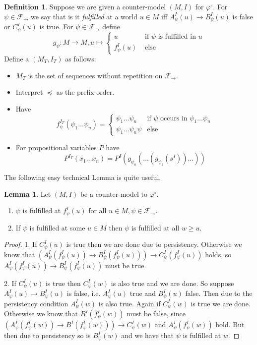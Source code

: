 \documentclass[a4paper,12pt]{report}
\theoremstyle{definition}
\theoremstyle{definition}
\theoremstyle{definition}
\newtheorem{lemma}[theorem]{Lemma}
\theoremstyle{definition}
\theoremstyle{definition}
\newtheorem{definition}[theorem]{Definition}
\theoremstyle{definition}
\theoremstyle{definition}
\begin{document}
	\begin{definition}
		Suppose we are given a counter-model $(M, I)$ for $\varphi^\circ$. For $\psi\in\mathcal F_\to$ we say that is it \textit{fulfilled} at a world $u\in M$ iff $A_\psi^I(u)\to B_\psi^I(u)$ is false or $C_\psi^I(u)$ is true. For $\psi\in\mathcal F_\to$ define $$g_\psi : M\to M, u\mapsto\begin{cases}
			u&\text{ if $\psi$ is fulfilled in $u$}\\
			f^I_\psi(u)&\text{ else}		
		\end{cases}$$Define a $(M_T, I_T)$ as follows:
	\begin{itemize}
		\item $M_T$ is the set of sequences without repetition on $\mathcal F_\to$.
		\item Interpret $\preceq$ as the prefix-order.
		\item Have $$f_\psi^{I_T}(\psi_1\dots\psi_n) = \begin{cases}
			\psi_1\dots\psi_n&\text{if $\psi$ occurs in $\psi_1\dots\psi_n$}\\
			\psi_1\dots\psi_n\psi&\text{else}			
		\end{cases}$$
		\item For propositional variables $P$ have $$P^{I_T}(x_1\dots x_n) = P^I(g_{\psi_n}(\dots(g_{\psi_1}(s^I))\dots))$$
	\end{itemize}
	\end{definition}

	The following easy technical Lemma is quite useful.
	\begin{lemma}
		Let $(M, I)$ be a counter-model to $\mathcal \varphi^\circ$.
		\begin{enumerate}
			\item $\psi$ is fulfilled at $f_\psi^I(u)$ for all $u\in M, \psi\in\mathcal F_\to$.
			\item If $\psi$ is fulfilled at some $u\in M$ then $\psi$ is fulfilled at all $w\geq u$.
		\end{enumerate}
		
	\end{lemma}

	\begin{proof}
		1. If $C_\psi^I(u)$ is true then we are done due to persistency. Otherwise we know that $(A_\psi^I(f_\psi^I(u))\to B_\psi^I(f_\psi^I(u)))\to C_\psi^I(f_\psi^I(u))$ holds, so $A_\psi^I(f_\psi^I(u))\to B_\psi^I(f_\psi^I(u))$ must be true.
		
		2. If $C_\psi^I(u)$ is true then $C_\psi^I(w)$ is also true and we are done. So suppose $A_\psi^I(u)\to B_\psi^I(u)$ is false, i.e. $A_\psi^I(u)$ true and $B_\psi^I(u)$ false. Then due to the persistency condition $A_\psi^I(w)$ is also true. Again if $C_\psi^I(w)$ is true we are done. Otherwise we know that $B^I(f^I_\psi(w))$ must be false, since $(A^I_\psi(f^I_\psi(w))\to B^I(f^I_\psi(w)))\to C^I_\psi(w)$ and $A^I_\psi(f^I_\psi(w))$ hold. But then due to persistency so is $B^I_\psi(w)$ and we have that $\psi$ is fulfilled at $w$.
	\end{proof}
\end{document}

